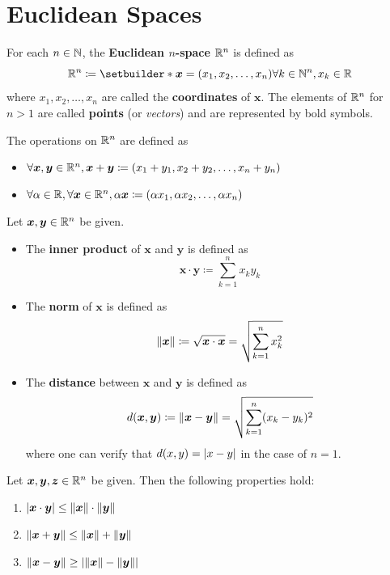 \section{Euclidean Spaces}

For each $n \in \N$, the \textbf{Euclidean $n$-space} $\R^{n}$ is defined as
\[
\R^{n} \coloneqq \setbuilder*{\bm{x} = (x_{1}, x_{2}, \dots, x_{n})}{\forall k \in \N^{n}, x_{k} \in \R}
\]
where $x_{1}, x_{2}, \dots, x_{n}$ are called the \textbf{coordinates} of $\bm{x}$. The elements of $\R^{n}$
for $n > 1$ are called \textbf{points} (or \emph{vectors}) and are represented by bold symbols.

\bigskip

The operations on $\R^{n}$ are defined as
\begin{itemize}
    \item $\forall \bm{x}, \bm{y} \in \R^{n},
    \bm{x} + \bm{y} \coloneqq (x_{1} + y_{1}, x_{2} + y_{2}, \dots, x_{n} + y_{n})$
    \item $\forall \alpha \in \R, \forall \bm{x} \in \R^{n},
    \alpha \bm{x} \coloneqq (\alpha x_{1}, \alpha x_{2}, \dots, \alpha x_{n})$
\end{itemize}

\bigskip

\begin{definition} \label{an:def:inner-product-norm-distance}
    Let $\bm{x}, \bm{y} \in \R^{n}$ be given.
    \begin{itemize}
        \item The \textbf{inner product} of $\bm{x}$ and $\bm{y}$ is defined as
        \[
        \bm{x} \cdot \bm{y} \coloneqq \sum_{k = 1}^{n} x_{k}y_{k}
        \]
        \item The \textbf{norm} of $\bm{x}$ is defined as
        \[
        \norm*{\bm{x}} \coloneqq \sqrt{\bm{x} \cdot \bm{x}} = \sqrt{\sum_{k = 1}^{n} x_{k}^{2}}
        \]
        \item The \textbf{distance} between $\bm{x}$ and $\bm{y}$ is defined as
        \[
        d(\bm{x}, \bm{y}) \coloneqq \norm*{\bm{x} - \bm{y}} = \sqrt{\sum_{k = 1}^{n} (x_{k} - y_{k})^{2}}
        \]
        where one can verify that $d(x, y) = \abs*{x - y}$ in the case of $n = 1$.
    \end{itemize}
\end{definition}

\bigskip

\begin{theorem} \label{an:thm:properties-of-inner-product-norm-distance}
    Let $\bm{x}, \bm{y}, \bm{z} \in \R^{n}$ be given. Then the following properties hold:
    \begin{enumerate}[label=\textbf{(\Alph*)}]
        \item $\abs*{\bm{x} \cdot \bm{y}} \leq \norm*{\bm{x}} \cdot \norm*{\bm{y}}$
        \item $\norm*{\bm{x} + \bm{y}} \leq \norm*{\bm{x}} + \norm*{\bm{y}}$
        \item $\norm*{\bm{x} - \bm{y}} \geq \abs*{\norm*{\bm{x}} - \norm*{\bm{y}}}$
    \end{enumerate}
\end{theorem}

